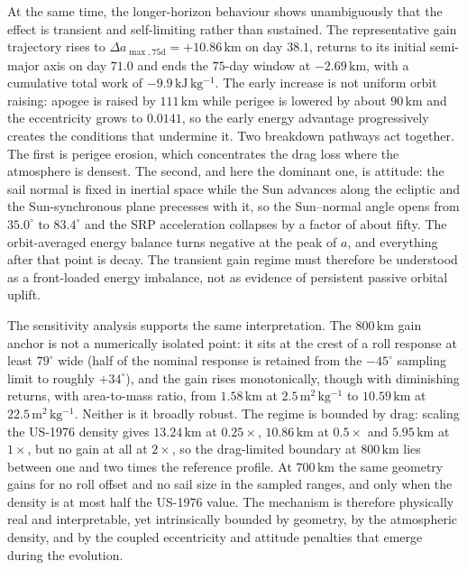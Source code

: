 \vspace{5pt}
\par\noindent At the same time, the longer-horizon behaviour shows unambiguously that the effect is transient and self-limiting rather than sustained. The representative gain trajectory rises to \(\Delta a_{\max,75\mathrm{d}} = +10.86\,\mathrm{km}\) on day \(38.1\), returns to its initial semi-major axis on day \(71.0\) and ends the \(75\)-day window at \(-2.69\,\mathrm{km}\), with a cumulative total work of \(-9.9\,\mathrm{kJ\,kg^{-1}}\). The early increase is not uniform orbit raising: apogee is raised by \(111\,\mathrm{km}\) while perigee is lowered by about \(90\,\mathrm{km}\) and the eccentricity grows to \(0.0141\), so the early energy advantage progressively creates the conditions that undermine it. Two breakdown pathways act together. The first is perigee erosion, which concentrates the drag loss where the atmosphere is densest. The second, and here the dominant one, is attitude: the sail normal is fixed in inertial space while the Sun advances along the ecliptic and the Sun-synchronous plane precesses with it, so the Sun--normal angle opens from \(35.0^\circ\) to \(83.4^\circ\) and the SRP acceleration collapses by a factor of about fifty. The orbit-averaged energy balance turns negative at the peak of \(a\), and everything after that point is decay. The transient gain regime must therefore be understood as a front-loaded energy imbalance, not as evidence of persistent passive orbital uplift.

\vspace{5pt}
\par\noindent The sensitivity analysis supports the same interpretation. The \(800\,\mathrm{km}\) gain anchor is not a numerically isolated point: it sits at the crest of a roll response at least \(79^\circ\) wide (half of the nominal response is retained from the \(-45^\circ\) sampling limit to roughly \(+34^\circ\)), and the gain rises monotonically, though with diminishing returns, with area-to-mass ratio, from \(1.58\,\mathrm{km}\) at \(2.5\,\mathrm{m^2\,kg^{-1}}\) to \(10.59\,\mathrm{km}\) at \(22.5\,\mathrm{m^2\,kg^{-1}}\). Neither is it broadly robust. The regime is bounded by drag: scaling the US-1976 density gives \(13.24\,\mathrm{km}\) at \(0.25\times\), \(10.86\,\mathrm{km}\) at \(0.5\times\) and \(5.95\,\mathrm{km}\) at \(1\times\), but no gain at all at \(2\times\), so the drag-limited boundary at \(800\,\mathrm{km}\) lies between one and two times the reference profile. At \(700\,\mathrm{km}\) the same geometry gains for no roll offset and no sail size in the sampled ranges, and only when the density is at most half the US-1976 value. The mechanism is therefore physically real and interpretable, yet intrinsically bounded by geometry, by the atmospheric density, and by the coupled eccentricity and attitude penalties that emerge during the evolution.

